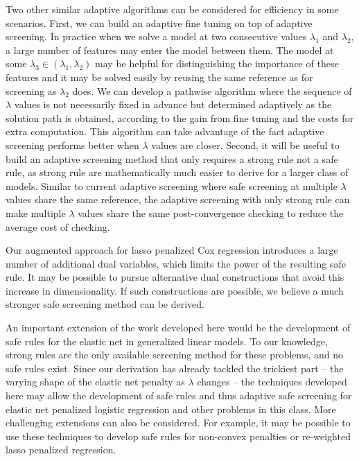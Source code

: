 Two other similar adaptive algorithms can be considered for efficiency in some scenarios. First, we can build an adaptive fine tuning on top of adaptive screening. In practice when we solve a model at two consecutive values $\lambda_1$ and $\lambda_2$, a large number of features may enter the model between them. The model at some $\lambda_3\in(\lambda_1,\lambda_2)$ may be helpful for distinguishing the importance of these features and it may be solved easily by reusing the same reference as for screening as $\lambda_2$ does. We can develop a pathwise algorithm where the sequence of $\lambda$ values is not necessarily fixed in advance but determined adaptively as the solution path is obtained, according to the gain from fine tuning and the costs for extra computation. This algorithm can take advantage of the fact adaptive screening performs better when $\lambda$ values are closer. Second, it will be useful to build an adaptive screening method that only requires a strong rule not a safe rule, as strong rule are mathematically much easier to derive for a larger class of models. Similar to current adaptive screening where safe screening at multiple $\lambda$ values share the same reference, the adaptive screening with only strong rule can make multiple $\lambda$ values share the same post-convergence checking to reduce the average cost of checking.

Our augmented approach for lasso penalized Cox regression introduces a large number of additional dual variables, which limits the power of the resulting safe rule. It may be possible to pursue alternative dual constructions that avoid this increase in dimensionality. If such constructions are possible, we believe a much stronger safe screening method can be derived.

An important extension of the work developed here would be the development of safe rules for the elastic net in generalized linear models. To our knowledge, strong rules are the only available screening method for these problems, and no safe rules exist. Since our derivation has already tackled the trickiest part -- the varying shape of the elastic net penalty as $\lambda$ changes -- the techniques developed here may allow the development of safe rules and thus adaptive safe screening for elastic net penalized logistic regression and other problems in this class. More challenging extensions can also be considered. For example, it may be possible to use these techniques to develop safe rules for non-convex penalties or re-weighted lasso penalized regression.
